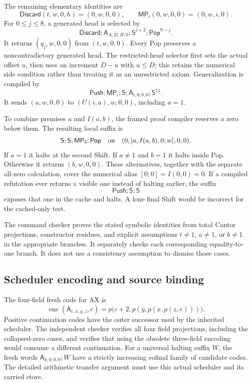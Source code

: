 The remaining elementary identities are
\[
 \mathsf{Discard}(t,w,0,h)=(0,w,0,0),
 \qquad
 \mathsf{MP}_i(0,w,0,0)=(0,w,i,0).
\]
For $0\leq j\leq8$, a generated head is selected by
\[
 \mathsf{Discard};\mathsf A_{A,D,H,0};
     \mathsf S^{j+2};\mathsf{Pop}^{9-j}.
\]
It returns $(q_j,w,0,0)$ from $(t,w,0,0)$. Every Pop preserves a
noncontradictory generated head. The restricted-head selector first
sets the actual offset $u$, then uses an increment $D-u$ with $u\leq D$;
this retains the numerical side condition rather than treating it as
an unrestricted axiom. Generalization is compiled by
\[
 \mathsf{Push};\mathsf{MP}_i;\mathsf S;
       \mathsf A_{i,0,0,0};\mathsf S^{11}.
\]
It sends $(a,w,0,0)$ to $(U(i,a),w,0,0)$, including $a=1$.

To combine premises $a$ and $I(a,b)$, the framed proof compiler
reserves a zero below them. The resulting local suffix is
\[
 \mathsf S;\mathsf S;\mathsf{MP}_b;\mathsf{Pop}
 \quad\hbox{on}\quad
 (0,[a,I(a,b),0;w],0,0).
\]
If $a=1$ it halts at the second Shift. If $a\ne1$ and $b=1$ it halts
inside Pop. Otherwise it returns $(b,w,0,0)$. These alternatives,
together with the separate all-zero calculation, cover the numerical
alias $[0;0]=I(0,0)=0$. If a compiled refutation ever returns a visible
one instead of halting earlier, the suffix
\[
                         \mathsf{Push};\mathsf S;\mathsf S
\]
exposes that one in the cache and halts. A lone final Shift would be
incorrect for the cached-only test.

The command checker proves the stated symbolic identities from total
Cantor projections, constructor residues, and explicit assumptions
$t\ne1$, $a\ne1$, or $b\ne1$ in the appropriate branches. It separately
checks each corresponding equality-to-one branch. It does not use a
consistency assumption to dismiss those cases.

\subsection{Scheduler encoding and source binding}

The four-field fresh code for AX is
\[
 \operatorname{enc}(\mathsf A_{c,x,y,z},e)
       =p\bigl(c+2,p(y,p(x,p(z,e)))\bigr).
\]
Positive continuation codes have the outer successor used by the
inherited scheduler. The independent checker verifies all four field
projections, including the collapsed-zero cases, and verifies that using
the obsolete three-field encoding would consume a different continuation.
For a universal halting suffix $W$, the fresh words
$\mathsf A_{k,0,0,0};W$ have a strictly increasing cofinal family of
candidate codes. The detailed arithmetic transfer argument must use
this actual scheduler and its carried store.

